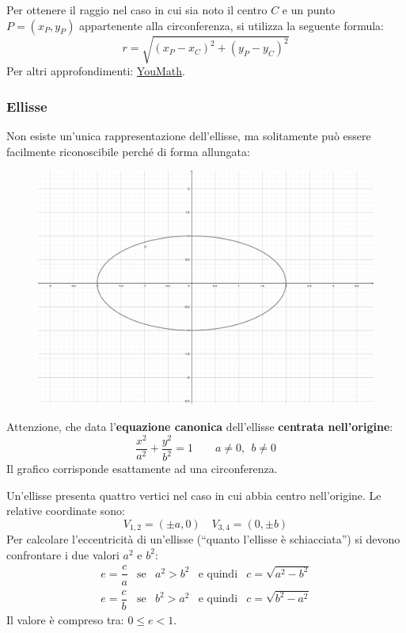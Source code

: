 \documentclass[a4paper]{article}
\newcommand{\dquotes}[1]{``#1''}
\begin{document}
	\noindent
	Per ottenere il raggio nel caso in cui sia noto il centro $C$ e un punto $P = \left(x_{P}, y_{P}\right)$ appartenente alla circonferenza, si utilizza la seguente formula:
	\begin{equation*}
		r = \sqrt{\left(x_{P} - x_{C}\right)^{2} + \left(y_{P} - y_{C}\right)^{2}}
	\end{equation*}
	Per altri approfondimenti: \href{https://www.youmath.it/formulari/formulari-di-geometria-analitica/440-circonferenza-e-cerchio-nel-piano-cartesiano.html}{YouMath}.\newpage
	
	\subsubsection{Ellisse}\label{subsubsection: ellisse}
	
	Non esiste un'unica rappresentazione dell'ellisse, ma solitamente può essere facilmente riconoscibile perché di forma allungata:
	\begin{figure}[!htp]
		\centering
		\includegraphics[width=.6\textwidth]{img/ellisse.pdf}
	\end{figure}
	
	\noindent
	Attenzione, che data l'\textbf{equazione canonica} dell'ellisse \textbf{centrata nell'origine}:
	\begin{equation*}
		\dfrac{x^{2}}{a^{2}} + \dfrac{y^{2}}{b^{2}} = 1 \hspace{2em} a \ne 0, \:\: b \ne 0
	\end{equation*}
	Il grafico corrisponde esattamente ad una circonferenza.\newline
	
	\noindent
	Un'ellisse presenta quattro vertici nel caso in cui abbia centro nell'origine. Le relative coordinate sono:
	\begin{equation*}
		V_{1,2} = \left(\pm a, 0\right) \hspace{1em} V_{3,4} = \left(0, \pm b\right)
	\end{equation*}
	Per calcolare l'eccentricità di un'ellisse (\dquotes{quanto l'ellisse è schiacciata}) si devono confrontare i due valori $a^{2}$ e $b^{2}$:
	\begin{equation*}
		\begin{array}{rclcl}
			e = \dfrac{c}{a} & \text{se} & a^{2} > b^{2} & \text{e quindi} & c = \sqrt{a^{2} - b^{2}}\\ [1em]
			e = \dfrac{c}{b} & \text{se} & b^{2} > a^{2} & \text{e quindi} & c = \sqrt{b^{2} - a^{2}}
		\end{array}
	\end{equation*}
	Il valore è compreso tra: $0 \le e < 1$.\newline
	
\end{document}
